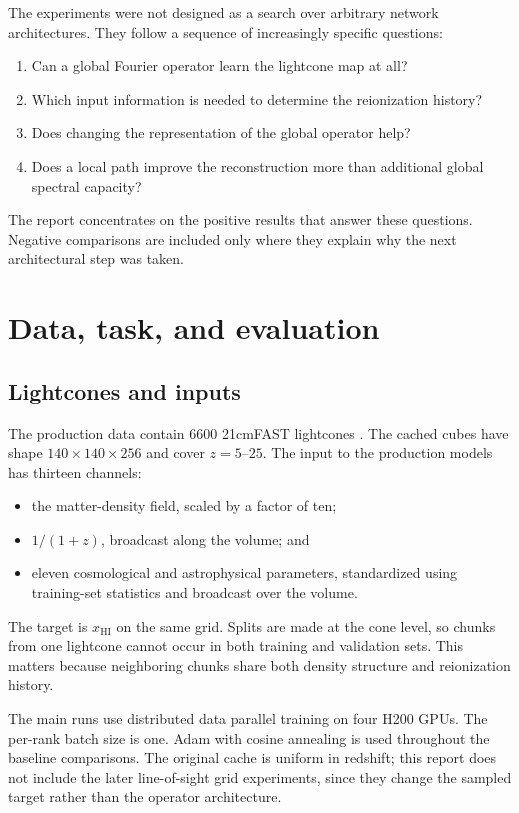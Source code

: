 \documentclass[11pt,a4paper]{article}
\newcommand{\xhi}{x_{\mathrm{HI}}}
\begin{document}
The experiments were not designed as a search over arbitrary network
architectures. They follow a sequence of increasingly specific questions:
\begin{enumerate}
  \item Can a global Fourier operator learn the lightcone map at all?
  \item Which input information is needed to determine the reionization
  history?
  \item Does changing the representation of the global operator help?
  \item Does a local path improve the reconstruction more than additional
  global spectral capacity?
\end{enumerate}
The report concentrates on the positive results that answer these questions.
Negative comparisons are included only where they explain why the next
architectural step was taken.

\section{Data, task, and evaluation}

\subsection{Lightcones and inputs}

The production data contain \(6600\) 21cmFAST lightcones
\cite{mesinger2010}. The cached cubes have
shape \(140\times140\times256\) and cover \(z=5\)--\(25\). The input to the
production models has thirteen channels:
\begin{itemize}
  \item the matter-density field, scaled by a factor of ten;
  \item \(1/(1+z)\), broadcast along the volume; and
  \item eleven cosmological and astrophysical parameters, standardized using
  training-set statistics and broadcast over the volume.
\end{itemize}
The target is \(\xhi\) on the same grid. Splits are made at the cone level,
so chunks from one lightcone cannot occur in both training and validation
sets. This matters because neighboring chunks share both density structure and
reionization history.

The main runs use distributed data parallel training on four H200 GPUs. The
per-rank batch size is one. Adam with cosine annealing is used throughout the
baseline comparisons. The original cache is uniform in redshift; this report
does not include the later line-of-sight grid experiments, since they change
the sampled target rather than the operator architecture.
\end{document}
